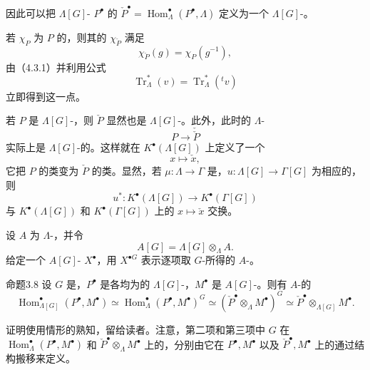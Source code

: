 因此可以把 $\Lambda[G]$- $P^\bullet$ 的 $\check P^\bullet=\operatorname{Hom}_\Lambda^\bullet(P^\bullet,\Lambda)$ 定义为一个 $\Lambda[G]$-。

若 $\chi_P$ 为 $P$ 的，则其的 $\chi_{\check P}$ 满足
\[
\chi_{\check P}(g)=\chi_P(g^{-1}),\tag{3.7.2}
\]
由（4.3.1）并利用公式
\[
\operatorname{Tr}_\Lambda^*(v)=\operatorname{Tr}_\Lambda^*({}^tv)
\]
立即得到这一点。

若 $P$ 是 $\Lambda[G]$-，则 $\check P$ 显然也是 $\Lambda[G]$-。此外，此时的 $\Lambda$-
\[
P\longrightarrow\check{\check P}
\]
实际上是 $\Lambda[G]$-的。这样就在 $K^\bullet(\Lambda[G])$ 上定义了一个
\[
x\longmapsto\check x,
\]
它把 $P$ 的类变为 $\check P$ 的类。显然，若 $\mu:\Lambda\longrightarrow\Gamma$ 是，$u:\Lambda[G]\longrightarrow\Gamma[G]$ 为相应的，则
\[
u^*:K^\bullet(\Lambda[G])\longrightarrow K^\bullet(\Gamma[G])
\]
与 $K^\bullet(\Lambda[G])$ 和 $K^\bullet(\Gamma[G])$ 上的 $x\longmapsto\check x$ 交换。

设 $A$ 为 $\Lambda$-，并令
\[
A[G]=\Lambda[G]\otimes_\Lambda A.
\]
给定一个 $A[G]$- $X^\bullet$，用 $X^{\bullet G}$ 表示逐项取 $G$-所得的 $A$-。

\begin{SGAresult}{命题}{3.8}
设 $G$ 是，$P^\bullet$ 是各均为的 $\Lambda[G]$-，$M^\bullet$ 是 $A[G]$-。则有 $A$-的
\[
\operatorname{Hom}_{\Lambda[G]}^\bullet(P^\bullet,M^\bullet)
\simeq\operatorname{Hom}_\Lambda^\bullet(P^\bullet,M^\bullet)^G
\simeq(\check P^\bullet\otimes_\Lambda M^\bullet)^G
\simeq\check P^\bullet\otimes_{\Lambda[G]}M^\bullet.
\tag{3.8.1}
\]
\end{SGAresult}
证明使用情形的熟知，留给读者。注意，第二项和第三项中 $G$ 在 $\operatorname{Hom}_\Lambda^\bullet(P^\bullet,M^\bullet)$ 和 $\check P^\bullet\otimes_\Lambda M^\bullet$ 上的，分别由它在 $P^\bullet,M^\bullet$ 以及 $\check P^\bullet,M^\bullet$ 上的通过结构搬移来定义。

